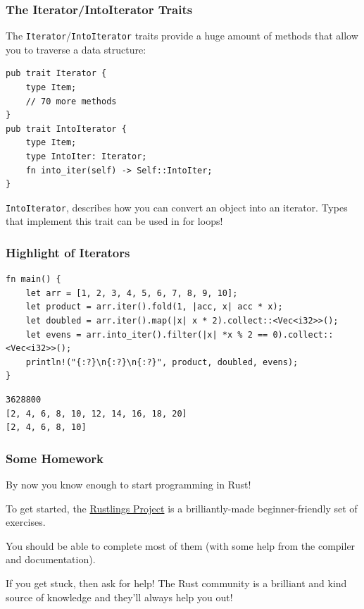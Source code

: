 \documentclass{slides}
\begin{document}
\begin{frame}[fragile]
\frametitle{The Iterator/IntoIterator Traits}
The \texttt{Iterator}/\texttt{IntoIterator} traits provide a huge amount of methods that allow you to traverse a data structure:
\begin{verbatim}
pub trait Iterator {
    type Item;
    // 70 more methods
}
pub trait IntoIterator {
    type Item;
    type IntoIter: Iterator;
    fn into_iter(self) -> Self::IntoIter;
}
\end{verbatim}
\texttt{IntoIterator}, describes how you can convert an object into an iterator. Types that implement this trait can be used in for loops!
\end{frame}

\begin{frame}[fragile]
\frametitle{Highlight of Iterators}
\begin{verbatim}
fn main() {
    let arr = [1, 2, 3, 4, 5, 6, 7, 8, 9, 10];
    let product = arr.iter().fold(1, |acc, x| acc * x);
    let doubled = arr.iter().map(|x| x * 2).collect::<Vec<i32>>();
    let evens = arr.into_iter().filter(|x| *x % 2 == 0).collect::<Vec<i32>>();
    println!("{:?}\n{:?}\n{:?}", product, doubled, evens);
}
\end{verbatim}
\begin{verbatim}
3628800
[2, 4, 6, 8, 10, 12, 14, 16, 18, 20]
[2, 4, 6, 8, 10]
\end{verbatim}
\end{frame}

\begin{frame}[fragile]
\frametitle{Some Homework}
By now you know enough to start programming in Rust!

To get started, the \href{https://github.com/rust-lang/rustlings}{Rustlings Project} is a brilliantly-made beginner-friendly set of exercises.

You should be able to complete most of them (with some help from the compiler and documentation).

If you get stuck, then ask for help! The Rust community is a brilliant and kind source of knowledge and they'll always help you out!
\end{frame}
\end{document}
